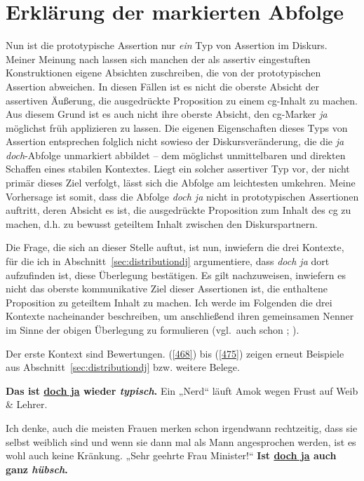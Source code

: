 \section{Erklärung der markierten Abfolge}
\label{sec:markiert} 
Nun ist die prototypische Assertion nur \emph{ein} Typ von Assertion im Diskurs. Meiner Meinung nach lassen sich manchen der als assertiv eingestuften Konstruktionen eigene Absichten zuschreiben, die von der prototypischen Assertion abweichen. In diesen Fällen ist es nicht die oberste Absicht der assertiven Äußerung, die ausgedrückte Proposition zu einem cg-Inhalt zu machen. Aus diesem Grund ist es auch nicht ihre oberste Absicht, den cg-Marker \textit{ja} möglichst früh applizieren zu lassen. Die eigenen Eigenschaften dieses Typs von Assertion entsprechen folg\-lich nicht sowieso der Diskursveränderung, die die \textit{ja doch}-Abfolge unmarkiert abbildet – dem möglichst unmittelbaren und direkten Schaffen eines stabilen Kontextes. Liegt ein solcher assertiver Typ vor, der nicht primär dieses Ziel verfolgt, lässt sich die Abfolge am leichtesten umkehren. Meine Vorhersage ist somit, dass die Abfolge \textit{doch ja} nicht in prototypischen Assertionen auftritt, deren Absicht es ist, die ausgedrückte Proposition zum Inhalt des cg zu machen, d.h. zu bewusst geteiltem Inhalt zwischen den Diskurspartnern.

Die Frage, die sich an dieser Stelle auftut, ist nun, inwiefern die drei Kontexte, für die ich in Abschnitt~\ref{sec:distributiondj} argumentiere, dass \textit{doch ja} dort aufzufinden ist, diese Überlegung bestätigen. Es gilt nachzuweisen, inwiefern es nicht das oberste kommunikative Ziel dieser Assertionen ist, die enthaltene Proposition zu geteiltem Inhalt zu machen. Ich werde im Folgenden die drei Kontexte nacheinander beschreiben, um anschließend ihren gemeinsamen Nenner im Sinne der obigen Überlegung zu formulieren (vgl.\ auch schon \citealt[200--204]{Mueller2014a}; \citealt[226--231]{Mueller2017b}). 

Der erste Kontext sind Bewertungen. (\ref{468}) bis (\ref{475}) zeigen erneut Beispiele aus Abschnitt~\ref{sec:distributiondj} bzw. weitere Belege.

\begin{exe}
	\ex\label{468} 
	\textbf{Das ist \underline{doch ja} wieder \textit{typisch}.} Ein „Nerd“ läuft Amok wegen Frust auf Weib \& Lehrer. 
\end{exe}

\begin{exe}
	\ex\label{469} 

	Ich denke, auch die meisten Frauen merken schon irgendwann rechtzeitig, dass sie selbst weiblich sind und wenn sie dann mal als Mann angesprochen 			werden, ist es wohl auch keine Kränkung. „Sehr geehrte Frau Minister!“ \textbf{Ist \underline{doch ja} auch ganz \textit{hübsch}.}		
\end{exe}	

